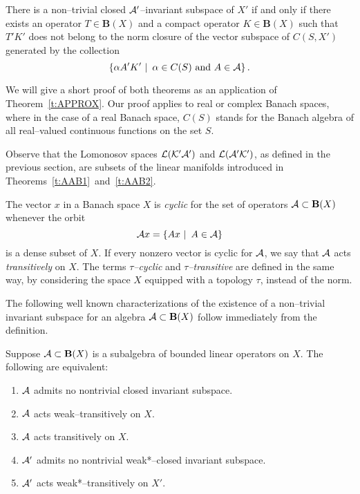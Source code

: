 \smallskip

\begin{thm}
\label{t:AAB2} There is a non--trivial closed ${\cal A}'$--invariant subspace of
$X'$ if and only if there exists an operator $T\in \mathbf{B}(X)$ and a
compact operator $K\in \mathbf{B}(X)$ such that $T'K'$ does not belong to the
norm closure of the vector subspace of $C(S,X')$ generated by the collection
\[ \left\{\alpha A'K'\,\,|\,\,\, \alpha \in C(S) \text{ and } A \in {\cal A}\right\}. \]
\end{thm}

\medskip

We will give a short proof of both theorems as an application of
Theorem~\ref{t:APPROX}. Our proof applies to real or complex Banach spaces,
where in the case of a real Banach space, $C(S)$ stands for the Banach
algebra of all real--valued continuous functions on the set $S$.

\smallskip

Observe that the Lomonosov spaces $\cal{L}(K'{\cal A}')$ and $\cal{L}({\cal A}'K')$, as
defined in the previous section, are subsets of the linear manifolds
introduced in Theorems~\ref{t:AAB1}~and~\ref{t:AAB2}.

\medskip

\begin{defn}
The vector $x$ in a Banach space $X$ is {\em cyclic} for the set of operators
${\cal A}\subset \mathbf{B}(X)$ whenever the orbit
\[ {\cal A} x = \left\{Ax\,\,|\,\,\, A \in {\cal A}\right\} \]
is a dense subset of $X$. If every nonzero vector is cyclic for ${\cal A}$, we say
that ${\cal A}$ acts {\em transitively} on $X$. The terms {\em $\tau$--cyclic} and
{\em $\tau$--transitive} are defined in the same way, by considering the
space $X$ equipped with a topology $\tau$, instead of the norm.
\end{defn}

\medskip

The following well known characterizations of the existence of a non--trivial
invariant subspace for an algebra ${\cal A} \subset \mathbf{B}(X)$ follow
immediately from the definition.

\begin{prop} \label{p:ISC}
Suppose ${\cal A}\subset \mathbf{B}(X)$ is a subalgebra of bounded linear operators
on $X$. The following are equivalent:
  \begin{enumerate}
    \item ${\cal A}$ admits no nontrivial closed invariant subspace.
    \item ${\cal A}$ acts weak--transitively on $X$.
    \item ${\cal A}$ acts transitively on $X$.
    \item ${\cal A}'$ admits no nontrivial weak*--closed invariant subspace.
    \item ${\cal A}'$ acts weak*--transitively on $X'$.
  \end{enumerate}
\end{prop}

